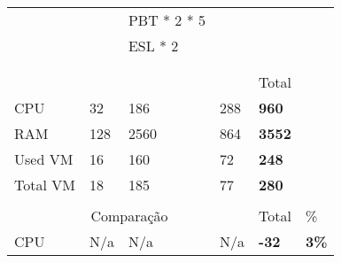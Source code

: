 \begin{table}[H]
\begin{tabular}{|l|l|l|l|l|l|}
                                     &                                             & \cellcolor[HTML]{A9D08E}PBT * 2 * 5                                            &              &                              & \\ 
                                     &                                             & \cellcolor[HTML]{A9D08E}ESL * 2 &                 & & \\ 
                                     &                                             &                                           &              &                              & \\ 
                                     &                                             &      &              &                              & \\ 
                                     &                                             &                                            &                  & Total                        & \\ \cline{1-5}
    \cellcolor[HTML]{C0C0C0}CPU      & 32                                          & 186                                        & 288                                          & \textbf{960}                 & \\ \cline{1-5}
    \cellcolor[HTML]{C0C0C0}RAM      & 128                                         & 2560                                       & 864                                          & \textbf{3552}                & \\ \cline{1-5}
    \cellcolor[HTML]{C0C0C0}Used VM  & 16                                          & 160                                        & 72                                           & \textbf{248}                 & \\ \cline{1-5}
    \cellcolor[HTML]{C0C0C0}Total VM & 18                                          & 185                                        & 77                                           & \textbf{280}                 & \\ \cline{1-5}
      &                                              &                                              &               &               & \\ \cline{1-6}
    \multicolumn{4}{c}{\cellcolor[HTML]{C0C0C0}Comparação}                       & Total         & \%             \\ \cline{1-6}
    \cellcolor[HTML]{C0C0C0}CPU                             & N/a                                                    & N/a                                                    & N/a & \textbf{-32} & \textbf{3\%} \\ \cline{1-6}

\end{tabular}
\end{table}
